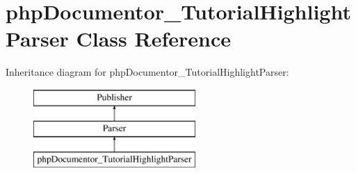 \hypertarget{classphp_documentor___tutorial_highlight_parser}{\section{php\-Documentor\-\_\-\-Tutorial\-Highlight\-Parser \-Class \-Reference}
\label{classphp_documentor___tutorial_highlight_parser}
}
\-Inheritance diagram for php\-Documentor\-\_\-\-Tutorial\-Highlight\-Parser\-:\begin{figure}[H]
\begin{center}
\leavevmode
\includegraphics[height=3.000000cm]{classphp_documentor___tutorial_highlight_parser}
\end{center}
\end{figure}
